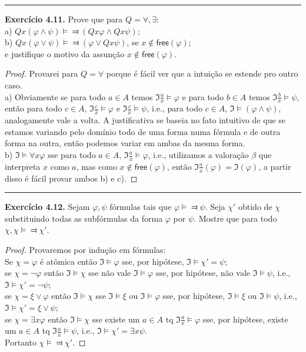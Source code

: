 \documentclass[11pt]{article}
\theoremstyle{definition}
\newcommand{\mf}[1]{\mathfrak{#1}}
\newcommand{\msf}[1]{\mathsf{#1}}
\begin{document}
\hrule

\textbf{Exercício 4.11.} Prove que para $Q=\forall,\exists$:\\
a) $Qx(\varphi\wedge\psi)\vDash\Dashv(Qx\varphi\wedge Qx\psi)$;\\
b) $Qx(\varphi\vee\psi)\vDash\Dashv(\varphi\vee Qx\psi)$, se $x\notin\msf{free}(\varphi)$;\\
e justifique o motivo da assunção $x\notin\msf{free}(\varphi).$

\begin{proof}
    Provarei para $Q=\forall$ porque é fácil ver que a intuição se estende pro outro caso.\\
    a) Obviamente se para todo $a\in A$ temos $\mf{I}\frac{a}{x}\vDash\varphi$ e para todo $b\in A$ temos $\mf{I}\frac{b}{x}\vDash\psi$, então para todo $c\in A$, $\mf{I}\frac{c}{x}\vDash\varphi$ e $\mf{I}\frac{c}{x}\vDash\psi$, i.e., para todo $c\in A$, $\mf{I}\vDash(\varphi\wedge\psi)$, analogamente vale a volta. A justificativa se baseia no fato intuitivo de que se estamos variando pelo domínio todo de uma forma numa fórmula e de outra forma na outra, então podemos variar em ambas da mesma forma.\\
    b) $\mf{I}\vDash\forall x\varphi$ sse para todo $a\in A$, $\mf{I}\frac{a}{x}\vDash\varphi$, i.e., utilizamos a valoração $\beta$ que interpreta $x$ como $a$, mas como $x\notin\msf{free}(\varphi)$, então $\mf{I}\frac{a}{x}(\varphi)=\mf{I}(\varphi)$, a partir disso é fácil provar ambos b) e c).
\end{proof}

\hrule

\textbf{Exercício 4.12.}
Sejam $\varphi,\psi$ fórmulas tais que $\varphi\vDash\Dashv\psi$. Seja $\chi'$ obtido de $\chi$ substituindo todas as subfórmulas da forma $\varphi$ por $\psi$. Mostre que para todo $\chi,\chi\vDash\Dashv\chi'$.

\begin{proof}
Provaremos por indução em fórmulas:\\
Se $\chi=\varphi$ é atômica então $\mf{I}\vDash\varphi$ sse, por hipótese, $\mf{I}\vDash\chi'=\psi$;\\
se $\chi=\neg\varphi$ então $\mf{I}\vDash\chi$ sse não vale $\mf{I}\vDash\varphi$ sse, por hipótese, não vale $\mf{I}\vDash\psi$, i.e., $\mf{I}\vDash\chi'=\neg\psi$;\\
se $\chi=\xi\vee\varphi$ então $\mf{I}\vDash\chi$ sse $\mf{I}\vDash\xi$ ou $\mf{I}\vDash\varphi$ sse, por hipótese, $\mf{I}\vDash\xi$ ou $\mf{I}\vDash\psi$, i.e., $\mf{I}\vDash\chi'=\xi\vee\psi$;\\
se $\chi=\exists x\varphi$ então $\mf{I}\vDash\chi$ sse existe um $a\in A$ tq $\mf{I}\frac{a}{x}\vDash\varphi$ sse, por hipótese, existe um $a\in A$ tq $\mf{I}\frac{a}{x}\vDash\psi$, i.e., $\mf{I}\vDash\chi'=\exists x\psi$.\\
Portanto $\chi\vDash\Dashv\chi'$.
\end{proof}
\end{document}
